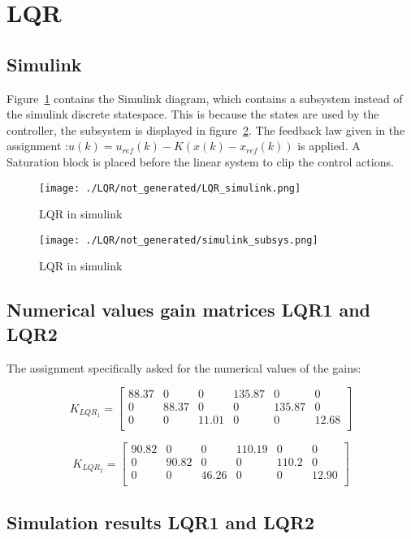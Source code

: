 \section{LQR}
\subsection{Simulink}

Figure~\ref{fig:LQR simulink} contains the Simulink diagram, which contains a subsystem instead of the simulink discrete statespace. This is because the states are used by the controller, the subsystem is displayed in figure~\ref{fig:LQR simulink subsystem}. The feedback law given in the assignment :$u(k)=u_{ref}(k) - K ( x(k)-x_{ref}(k) )$ is applied. A Saturation block is placed before the linear system to clip the control actions.

\begin{figure}[H]
	\centering
	\texttt{[image: ./LQR/not\_generated/LQR\_simulink.png]}
	\caption{LQR in simulink}
	\label{fig:LQR simulink}
\end{figure}

\begin{figure}[H]
	\centering
	\texttt{[image: ./LQR/not\_generated/simulink\_subsys.png]}
	\caption{LQR in simulink}
	\label{fig:LQR simulink subsystem}
\end{figure}

\subsection{Numerical values gain matrices LQR1 and LQR2}
The assignment specifically asked for the numerical values of the gains:

$$
K_{LQR_1} = 
\begin{bmatrix}
88.37 & 0 & 0 & 135.87 & 0 & 0 \\
0 & 88.37 & 0 & 0 & 135.87 & 0 \\
0 & 0 & 11.01 & 0 & 0 & 12.68 \\
\end{bmatrix}
$$

$$
K_{LQR_2} = 
\begin{bmatrix}
90.82 & 0 & 0 & 110.19 & 0 & 0 \\
0 & 90.82 & 0 & 0 & 110.2 & 0 \\
0 & 0 & 46.26 & 0 & 0 & 12.90 \\
\end{bmatrix}
$$

\subsection{Simulation results LQR1 and LQR2}

